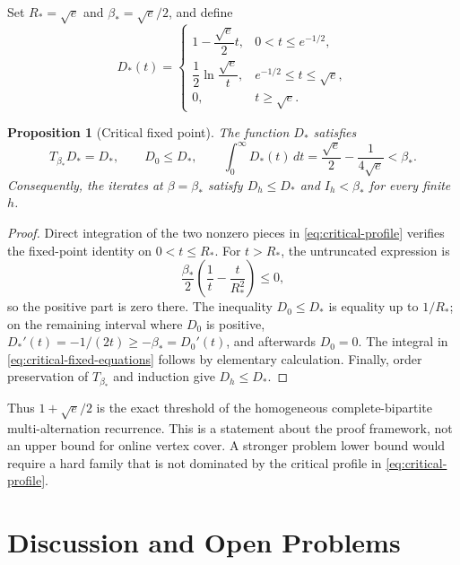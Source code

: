 \documentclass[11pt,letterpaper]{article}
\newcommand{\cref}[1]{\autoref{#1}}
\newtheorem{proposition}[theorem]{Proposition}
\theoremstyle{definition}
\theoremstyle{remark}
\begin{document}
Set $R_*=\sqrt e$ and $\beta_*=\sqrt e/2$, and define
\begin{equation}\label{eq:critical-profile} D_*(t)=\begin{cases} 1-\dfrac{\sqrt e}{2}t, & 0<t\le e^{-1/2},\\[2mm] \dfrac{1}{2}\ln\dfrac{\sqrt e}{t}, & e^{-1/2}\le t\le\sqrt e,\\[2mm] 0, & t\ge\sqrt e. \end{cases} \end{equation}

\begin{proposition}[Critical fixed point]\label{prop:critical-fixed-point}
The function $D_*$ satisfies
\begin{equation}\label{eq:critical-fixed-equations} T_{\beta_*}D_*=D_*,\qquad D_0\le D_*,\qquad \int_0^{\infty}D_*(t)\,dt=\frac{\sqrt e}{2}-\frac{1}{4\sqrt e}<\beta_*. \end{equation}
Consequently, the iterates at $\beta=\beta_*$ satisfy $D_h\le D_*$ and $I_h<\beta_*$ for every finite $h$.
\end{proposition}

\begin{proof}
Direct integration of the two nonzero pieces in \cref{eq:critical-profile} verifies the fixed-point identity on $0<t\le R_*$.
For $t>R_*$, the untruncated expression is
\begin{equation}\label{eq:outside-critical-support} \frac{\beta_*}{2}\left(\frac{1}{t}-\frac{t}{R_*^2}\right)\le0, \end{equation}
so the positive part is zero there.
The inequality $D_0\le D_*$ is equality up to $1/R_*$; on the remaining interval where $D_0$ is positive, $D_*'(t)=-1/(2t)\ge-\beta_*=D_0'(t)$, and afterwards $D_0=0$.
The integral in \cref{eq:critical-fixed-equations} follows by elementary calculation.
Finally, order preservation of $T_{\beta_*}$ and induction give $D_h\le D_*$.
\end{proof}

Thus $1+\sqrt e/2$ is the exact threshold of the homogeneous complete-bipartite multi-alternation recurrence.
This is a statement about the proof framework, not an upper bound for online vertex cover.
A stronger problem lower bound would require a hard family that is not dominated by the critical profile in \cref{eq:critical-profile}.

\section{Discussion and Open Problems}\label{sec:discussion}
\end{document}
